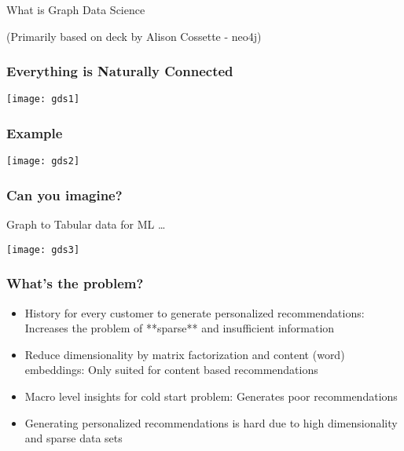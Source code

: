 \begin{frame}[fragile]\frametitle{}
\begin{center}
{\Large What is Graph Data Science}

{\tiny (Primarily based on deck by Alison Cossette - neo4j)}
\end{center}
\end{frame}

\begin{frame}[fragile]\frametitle{Everything is Naturally Connected}

\begin{center}
\texttt{[image: gds1]}
\end{center}

\end{frame}

\begin{frame}[fragile]\frametitle{Example}

\begin{center}
\texttt{[image: gds2]}
\end{center}

\end{frame}

\begin{frame}[fragile]\frametitle{Can you imagine?}

Graph to Tabular data for ML \ldots

\begin{center}
\texttt{[image: gds3]}
\end{center}

\end{frame}


\begin{frame}[fragile]\frametitle{What's the problem?}

\begin{itemize}
\item History for every customer to generate personalized recommendations: Increases the problem of **sparse** and insufficient information
\item Reduce dimensionality by matrix factorization and content (word) embeddings: Only suited for content based recommendations
\item Macro level insights for cold start problem: Generates poor recommendations
\item Generating personalized recommendations is hard due to high dimensionality and sparse data sets
\end{itemize}

\end{frame}


